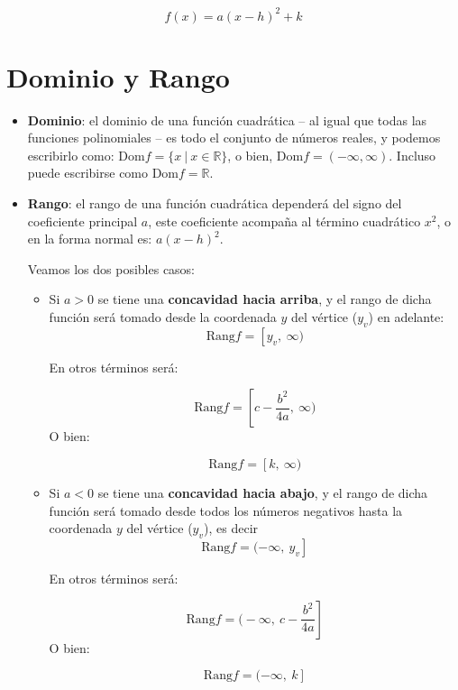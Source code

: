 \documentclass[letterpaper, 10pt, oneside]{book}
\begin{document}
	\begin{tcolorbox}[colback=white]
		$$f(x)=a\left(x-h\right)^2+k$$
	\end{tcolorbox}
	
	\section{Dominio y Rango}
	
	\begin{itemize}
		\item \textbf{Dominio}: el dominio de una función cuadrática -- al igual que todas las funciones polinomiales -- es todo el conjunto de números reales, y podemos escribirlo como: $\text{Dom}f = \{x\ \big| \ x \in \mathbb{R}\}$, o bien, $\text{Dom}f = (-\infty, \infty)$. Incluso puede escribirse como $\text{Dom}f = \mathbb{R}$. 
		
		\item \textbf{Rango}: el rango de una función cuadrática dependerá del signo del coeficiente principal $a$, este coeficiente acompaña al término cuadrático $x^2$, o en la forma normal es: $a(x-h)^2$. 
		
		Veamos los dos posibles casos:
		
		\begin{itemize}
			\item Si $a>0$ se tiene una \textbf{concavidad hacia arriba}, y el rango de dicha función será tomado desde la coordenada $y$ del vértice ($y_v$) en adelante: $$\text{Rang}f = \left[y_v, \ \infty\right.)$$
			
			En otros términos será:
			
			$$\text{Rang}f = \left[c-\frac{b^2}{4a}, \ \infty\right.\bigg)$$ O bien:
			
			$$\text{Rang}f = \left[k, \ \infty\right.)$$
			
			
			\item Si $a<0$ se tiene una \textbf{concavidad hacia abajo}, y el rango de dicha función será tomado desde todos los números negativos hasta la coordenada $y$ del vértice ($y_v$), es decir $$\text{Rang}f = \left.(-\infty, \ y_v\right]$$
			
			En otros términos será:
			
			$$\text{Rang}f = \left.\bigg(-\infty, \ c-\frac{b^2}{4a}\right]$$ O bien:
			
			$$\text{Rang}f = \left.(-\infty, \ k\right]$$
		\end{itemize}
	\end{itemize}
	
\end{document}
